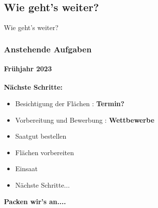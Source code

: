 \documentclass[aspectratio=169]{beamer}
\begin{document}
\subsection[Aufgaben]{Wie geht's weiter?}

\begin{frame}{Wie geht's weiter?}
	\frametitle{Anstehende Aufgaben} 
	\framesubtitle{Frühjahr 2023}

	\textbf{Nächste Schritte:}\\
	\begin{itemize}
		\item 
			Besichtigung der Flächen : 
			\textbf{Termin?} \pause 
		\item 
			Vorbereitung und Bewerbung : 
			\textbf{Wettbewerbe} \pause 
		\item 
			Saatgut bestellen \pause
		\item 
			Flächen vorbereiten \pause
		\item 
			Einsaat \pause
		\item 
			Nächste Schritte...%
	\end{itemize}
	\begin{center}
	\textbf{Packen wir's an....}	
	\end{center}
\end{frame}




\end{document}
